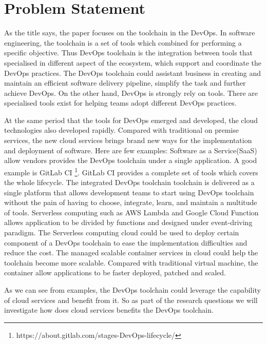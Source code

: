 \section{Problem Statement}
As the title says, the paper focuses on the toolchain in the DevOps. In software engineering, the toolchain is a set of tools which combined for performing a specific objective. Thus DevOps toolchain is the integration between tools that specialised in different aspect of the ecosystem, which support and coordinate the DevOps practices. The DevOps toolchain could assistant business in creating and maintain an efficient software delivery pipeline, simplify the task and further achieve DevOps.\cite{DevOpsto7:online}\cite{Toolchai10:online} On the other hand, DevOps is strongly rely on tools. There are specialised tools exist for helping teams adopt different DevOps practices\cite{zhu2016devops}.
\par
At the same period that the tools for DevOps emerged and developed, the cloud technologies also developed rapidly. Compared with traditional on premise services, the new cloud services brings brand new ways for the implementation and deployment of software. Here are few examples:
Software as a Service(SaaS) allow vendors provides the DevOps toolchain under a single application. A good example is GitLab CI \footnote{https://about.gitlab.com/stages-DevOps-lifecycle/}. GitLab CI provides a complete set of tools which covers the whole lifecycle. The integrated DevOps toolchain toolchain is delivered as a single platform that allows development teams to start using DevOps toolchain without the pain of having to choose, integrate, learn, and maintain a multitude of tools. Serverless computing such as AWS Lambda and Google Cloud Function allows application to be divided by functions and designed under event-driving paradigm. The Serverless computing cloud could be used to deploy certain component of a DevOps toolchain to ease the implementation difficulties and reduce the cost.
The managed scalable container services in cloud could help the toolchain become more scalable. Compared with traditional virtual machine, the container allow applications to be faster deployed, patched and scaled.\cite{WhatareC61:online}
\par
As we can see from examples, the DevOps toolchain could leverage the capability of cloud services and benefit from it. So as part of the research questions we will investigate how does cloud services benefits the DevOps toolchain.
\par
